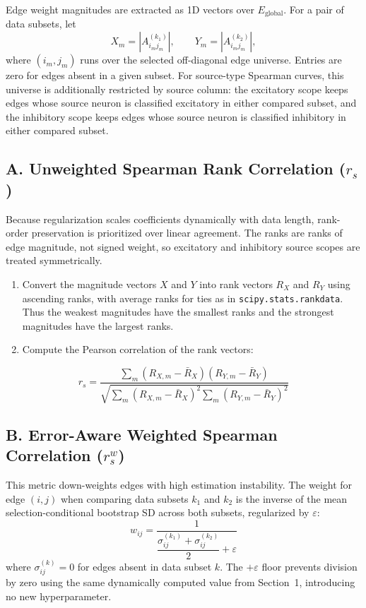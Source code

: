 \documentclass[11pt]{article}
\begin{document}
Edge weight magnitudes are extracted as 1D vectors over $E_{\text{global}}$. For a pair of data subsets, let
\[
  X_m = |A^{(k_1)}_{i_m j_m}|, \qquad
  Y_m = |A^{(k_2)}_{i_m j_m}|,
\]
where $(i_m,j_m)$ runs over the selected off-diagonal edge universe. Entries are zero for edges absent in a given subset. For source-type Spearman curves, this universe is additionally restricted by source column: the excitatory scope keeps edges whose source neuron is classified excitatory in either compared subset, and the inhibitory scope keeps edges whose source neuron is classified inhibitory in either compared subset.

\subsection*{A. Unweighted Spearman Rank Correlation ($r_s$)}

Because regularization scales coefficients dynamically with data length, rank-order preservation is prioritized over linear agreement. The ranks are ranks of edge magnitude, not signed weight, so excitatory and inhibitory source scopes are treated symmetrically.
\begin{enumerate}
    \item Convert the magnitude vectors $X$ and $Y$ into rank vectors $R_X$ and $R_Y$ using ascending ranks, with average ranks for ties as in \texttt{scipy.stats.rankdata}. Thus the weakest magnitudes have the smallest ranks and the strongest magnitudes have the largest ranks.
    \item Compute the Pearson correlation of the rank vectors:
\end{enumerate}
\[
r_s = \frac{\sum_m (R_{X,m} - \bar{R}_X)(R_{Y,m} - \bar{R}_Y)}{\sqrt{\sum_m (R_{X,m} - \bar{R}_X)^2 \sum_m (R_{Y,m} - \bar{R}_Y)^2}}
\]

\subsection*{B. Error-Aware Weighted Spearman Correlation ($r_s^w$)}

This metric down-weights edges with high estimation instability. The weight for edge $(i,j)$ when comparing data subsets $k_1$ and $k_2$ is the inverse of the mean selection-conditional bootstrap SD across both subsets, regularized by $\varepsilon$:
\[
w_{ij} = \frac{1}{\dfrac{\sigma^{(k_1)}_{ij} + \sigma^{(k_2)}_{ij}}{2} + \varepsilon}
\]
where $\sigma^{(k)}_{ij} = 0$ for edges absent in data subset $k$. The $+\varepsilon$ floor prevents division by zero using the same dynamically computed value from Section~1, introducing no new hyperparameter.
\end{document}
